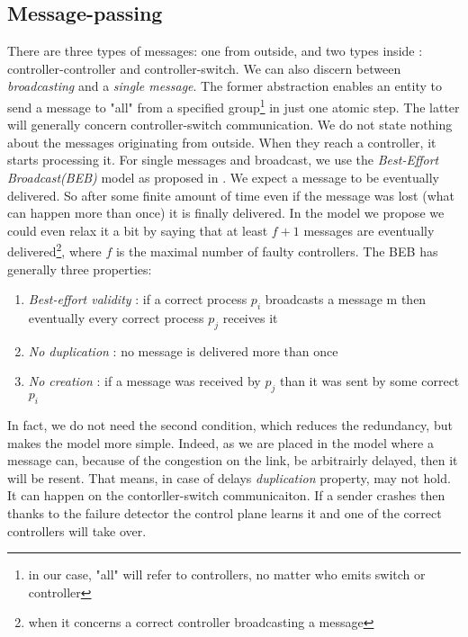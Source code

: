 \documentclass{article}
\theoremstyle{remark}
\begin{document}
\subsection{Message-passing}
There are three types of messages: one from outside, and two types inside : controller-controller and controller-switch. We can also discern between \emph{broadcasting} and a \emph{single message}. The former abstraction enables an entity to send a message to "all" from a specified group\footnote{in our case, "all" will refer to controllers, no matter who emits switch or controller} in just one atomic step. The latter will generally concern controller-switch communication. 
We do not state nothing about the messages originating from outside. When they reach a controller, it starts processing it. For single messages and broadcast, we use the \emph{Best-Effort Broadcast(BEB)} model as proposed in \cite{Guerraoui:2010:IRD:1951643}. We expect a message to be eventually delivered. So after some finite amount of time even if the message was lost (what can happen more than once) it is finally delivered. In the model we propose we could even relax it a bit by saying that at least $f+1$ messages are eventually delivered\footnote{when it concerns a correct controller broadcasting a message}, where $f$ is the maximal number of faulty controllers. 
The BEB has generally three properties:
\begin{enumerate}
\item \emph{Best-effort validity} : if a correct process $p_i$ broadcasts a message m then eventually every correct process $p_j$ receives it
\item \emph{No duplication} : no message is delivered more than once
\item \emph{No creation} : if a message was received by $p_j$ than it was sent by some correct $p_i$
\end{enumerate}
In fact, we do not need the second condition, which reduces the redundancy, but makes the model more simple. Indeed, as we are placed in the model where a message can, because of the congestion on the link, be arbitrairly delayed, then it will be resent. That means, in case of delays \emph{duplication} property, may not hold. It can happen on the contorller-switch communicaiton.
If a sender crashes then thanks to the failure detector the control plane learns it and one of the correct controllers will take over.
\end{document}
